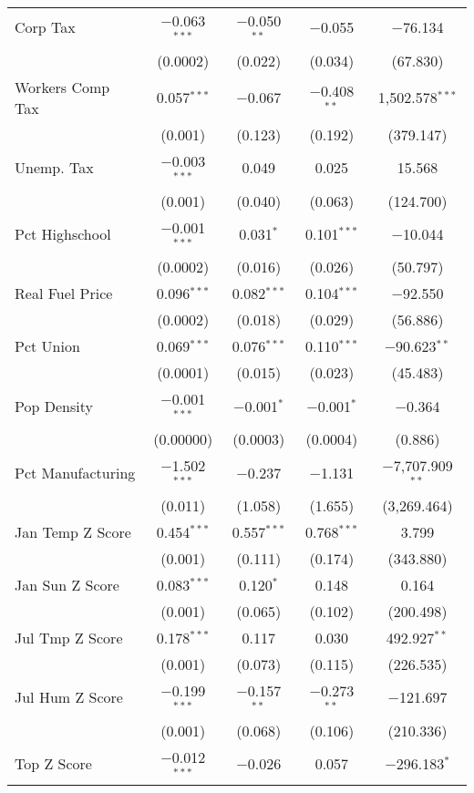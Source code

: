 \begin{table}[!htbp]
\begin{tabular}{@{\extracolsep{5pt}}lcccc}
  Corp Tax & $-$0.063$^{***}$ & $-$0.050$^{**}$ & $-$0.055 & $-$76.134 \\ 
  & (0.0002) & (0.022) & (0.034) & (67.830) \\ 
  Workers Comp Tax & 0.057$^{***}$ & $-$0.067 & $-$0.408$^{**}$ & 1,502.578$^{***}$ \\ 
  & (0.001) & (0.123) & (0.192) & (379.147) \\ 
  Unemp. Tax & $-$0.003$^{***}$ & 0.049 & 0.025 & 15.568 \\ 
  & (0.001) & (0.040) & (0.063) & (124.700) \\ 
  Pct Highschool & $-$0.001$^{***}$ & 0.031$^{*}$ & 0.101$^{***}$ & $-$10.044 \\ 
  & (0.0002) & (0.016) & (0.026) & (50.797) \\ 
  Real Fuel Price & 0.096$^{***}$ & 0.082$^{***}$ & 0.104$^{***}$ & $-$92.550 \\ 
  & (0.0002) & (0.018) & (0.029) & (56.886) \\ 
  Pct Union & 0.069$^{***}$ & 0.076$^{***}$ & 0.110$^{***}$ & $-$90.623$^{**}$ \\ 
  & (0.0001) & (0.015) & (0.023) & (45.483) \\ 
  Pop Density & $-$0.001$^{***}$ & $-$0.001$^{*}$ & $-$0.001$^{*}$ & $-$0.364 \\ 
  & (0.00000) & (0.0003) & (0.0004) & (0.886) \\ 
  Pct Manufacturing & $-$1.502$^{***}$ & $-$0.237 & $-$1.131 & $-$7,707.909$^{**}$ \\ 
  & (0.011) & (1.058) & (1.655) & (3,269.464) \\ 
  Jan Temp Z Score & 0.454$^{***}$ & 0.557$^{***}$ & 0.768$^{***}$ & 3.799 \\ 
  & (0.001) & (0.111) & (0.174) & (343.880) \\ 
  Jan Sun Z Score & 0.083$^{***}$ & 0.120$^{*}$ & 0.148 & 0.164 \\ 
  & (0.001) & (0.065) & (0.102) & (200.498) \\ 
  Jul Tmp Z Score & 0.178$^{***}$ & 0.117 & 0.030 & 492.927$^{**}$ \\ 
  & (0.001) & (0.073) & (0.115) & (226.535) \\ 
  Jul Hum Z Score & $-$0.199$^{***}$ & $-$0.157$^{**}$ & $-$0.273$^{**}$ & $-$121.697 \\ 
  & (0.001) & (0.068) & (0.106) & (210.336) \\ 
  Top Z Score & $-$0.012$^{***}$ & $-$0.026 & 0.057 & $-$296.183$^{*}$ \\ 

\end{tabular}
\end{table}
